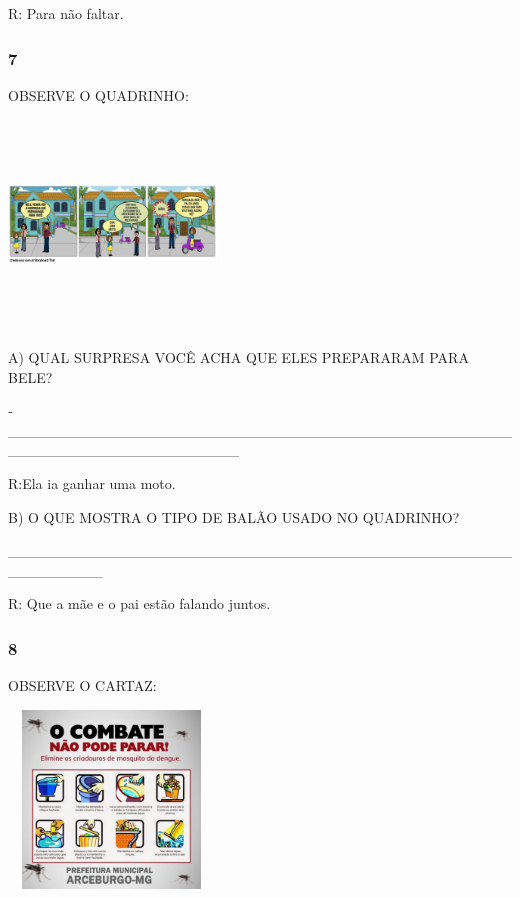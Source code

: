 R: Para não faltar.

\subsubsection{7}\label{section-87}

OBSERVE O QUADRINHO:

\includegraphics[width=2.17917in,height=2.18750in]{media/image129.png}

A) QUAL SURPRESA VOCÊ ACHA QUE ELES PREPARARAM PARA BELE?

­­­­­­­­­­­­­­­­­­­­­­­\_\_\_\_\_\_\_\_\_\_\_\_\_\_\_\_\_\_\_\_\_\_\_\_\_\_\_\_\_\_\_\_\_\_\_\_\_\_\_\_\_\_\_\_\_\_\_\_\_\_\_\_\_\_\_\_\_\_\_\_\_\_\_\_\_\_\_\_\_\_

R:Ela ia ganhar uma moto.

B) O QUE MOSTRA O TIPO DE BALÃO USADO NO QUADRINHO?

\_\_\_\_\_\_\_\_\_\_\_\_\_\_\_\_\_\_\_\_\_\_\_\_\_\_\_\_\_\_\_\_\_\_\_\_\_\_\_\_\_\_\_\_\_\_\_\_\_\_\_\_\_\_\_\_\_

R: Que a mãe e o pai estão falando juntos.

\subsubsection{8}\label{section-88}

OBSERVE O CARTAZ:

\includegraphics[width=2.15306in,height=1.86730in]{media/image134.jpeg}

